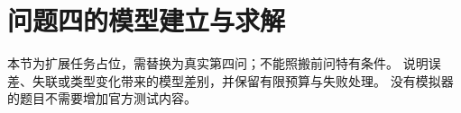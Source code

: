 \section{问题四的模型建立与求解}
本节为扩展任务占位，需替换为真实第四问；不能照搬前问特有条件。
说明误差、失联或类型变化带来的模型差别，并保留有限预算与失败处理。
没有模拟器的题目不需要增加官方测试内容。
